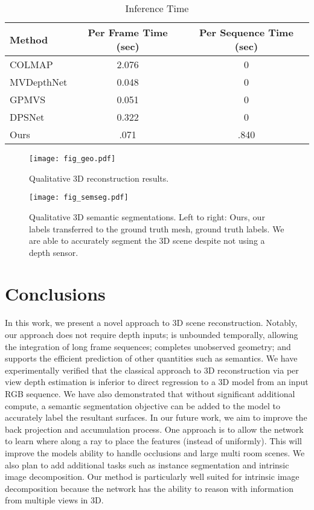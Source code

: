 \documentclass[runningheads]{llncs}
\begin{document}
\begin{table}[]
\centering
\caption{Inference Time}
\begin{tabular}{lcc}
\hline
Method & Per Frame Time (sec) & Per Sequence Time (sec)\\
\hline
COLMAP \cite{schoenberger2016mvs} & 2.076 & 0 \\
MVDepthNet \cite{wang2018mvdepthnet}& 0.048 & 0 \\
GPMVS \cite{hou2019multi} & 0.051 & 0 \\
DPSNet \cite{im2019dpsnet} & 0.322  & 0 \\
\midrule
Ours & .071 & .840 \\
\hline

\end{tabular}
\label{tab:time}
\end{table}


\begin{figure}
\centering
\texttt{[image: fig\_geo.pdf]}
\caption{Qualitative 3D reconstruction results.
}
\label{fig:geo1}
\end{figure}

\begin{figure}
\centering
\texttt{[image: fig\_semseg.pdf]}
\caption{Qualitative 3D semantic segmentations. Left to right: Ours, our labels transferred to the ground truth mesh, ground truth labels.
We are able to accurately segment the 3D scene despite not using a depth sensor.
}
\label{fig:semseg}
\end{figure}



\section{Conclusions}
In this work, we present a novel approach to 3D scene reconstruction. Notably, our approach does not require depth inputs; is unbounded temporally, allowing the integration of long frame sequences; completes unobserved geometry; and supports the efficient prediction of other quantities such as semantics. We have experimentally verified that the classical approach to 3D reconstruction via per view depth estimation is inferior to direct regression to a 3D model from an input RGB sequence. We have also demonstrated that without significant additional compute, a semantic segmentation objective can be added to the model to accurately label the resultant surfaces. 
In our future work, we aim to improve the back projection and accumulation process. One approach is to allow the network to learn where along a ray to place the features (instead of uniformly). This will improve the models ability to handle occlusions and large multi room scenes.
We also plan to add additional tasks such as instance segmentation and intrinsic image decomposition.
Our method is particularly well suited for intrinsic image decomposition because the network has the ability to reason with information from multiple views in 3D.







\end{document}
